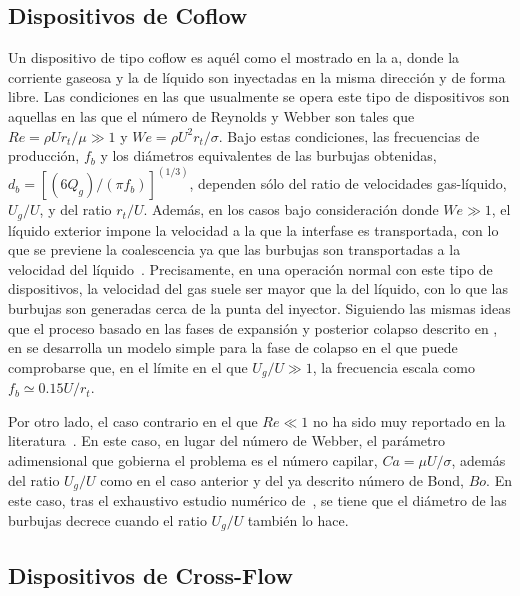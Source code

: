 \subsection{Dispositivos de Coflow}

Un dispositivo de tipo coflow es aquél como el mostrado en la a, donde la corriente gaseosa y la de líquido son inyectadas en la misma dirección y de forma libre. Las condiciones en las que usualmente se opera este tipo de dispositivos son aquellas en las que el número de Reynolds y Webber son tales que $Re = \rho U r_{t}/\mu \gg 1$ y $We = \rho U^{2} r_{t}/ \sigma$. Bajo estas condiciones, las frecuencias de producción, $f_{b}$ y los diámetros equivalentes de las burbujas obtenidas, $d_{b} = \left[\left(6Q_{g}\right)/\left(\pi f_{b}\right)\right]^{\left(1/3\right)} $, dependen sólo del ratio de velocidades gas-líquido, $U_{g}/U$, y del ratio $r_{t}/U$. Además, en los casos bajo consideración donde $We \gg 1$, el líquido exterior impone la velocidad a la que la interfase es transportada, con lo que se previene la coalescencia ya que las burbujas son transportadas a la velocidad del líquido~\cite{Sevilla2005a}. Precisamente, en una operación normal con este tipo de dispositivos, la velocidad del gas suele ser mayor que la del líquido, con lo que las burbujas son generadas cerca de la punta del inyector. Siguiendo las mismas ideas que el proceso basado en las fases de expansión y posterior colapso descrito en , en \cite{Gordillo2007a} se desarrolla un modelo simple para la fase de colapso en el que puede comprobarse que, en el límite en el que $U_{g}/U \gg 1$, la frecuencia escala como $f_{b}\simeq 0.15U/r_{t}$. 

Por otro lado, el caso contrario en el que $Re \ll 1$ no ha sido muy reportado en la literatura~\cite{Rodriguez-Rodriguez2015b}. En este caso, en lugar del número de Webber, el parámetro adimensional que gobierna el problema es el número capilar, $Ca = \mu U /\sigma$, además del ratio $U_{g}/U$ como en el caso anterior y del ya descrito número de Bond, $Bo$. En este caso, tras el exhaustivo estudio numérico de~\cite{Suryo2006a}, se tiene que el diámetro de las burbujas decrece cuando el ratio $U_{g}/U$ también lo hace. 

\subsection{Dispositivos de Cross-Flow}

